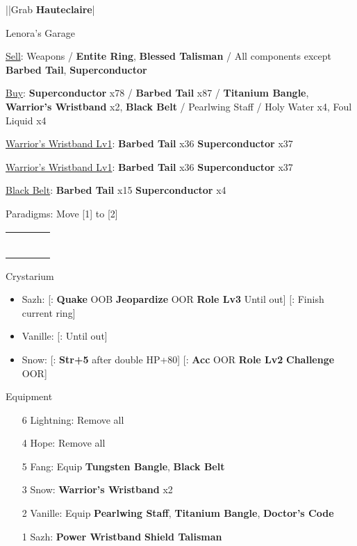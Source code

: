 \begin{mainlist}
	\item \skip|\skip|Grab \textbf{Hauteclaire}|\skip
\end{mainlist}
\begin{shop}{Lenora's Garage}
	\item \underline{Sell}: Weapons / \textbf{Entite Ring}, \textbf{Blessed Talisman} / All components except \textbf{Barbed Tail}, \textbf{Superconductor}
	\item \underline{Buy}: \textbf{Superconductor} x78 / \textbf{Barbed Tail} x87 / \textbf{Titanium Bangle}, \textbf{Warrior's Wristband} x2, \textbf{Black Belt} / Pearlwing Staff / Holy Water x4, Foul Liquid x4
\end{shop}
\begin{upgrade}
	\item \underline{Warrior's Wristband Lv1}: \textbf{Barbed Tail} x36 \to \textbf{Superconductor} x37
	\item \underline{Warrior's Wristband Lv1}: \textbf{Barbed Tail} x36 \to \textbf{Superconductor} x37
	\item \underline{Black Belt}: \textbf{Barbed Tail} x15 \to \textbf{Superconductor} x4
\end{upgrade}
\begin{menu}
	\item Paradigms: Move [1] to [2]
	\begin{tabular}{cccl}
		\chrole{\syn} & \sab & \rav &          \\
		\com          & \med & \com &          \\
		\syn          & \med & \com &  \\
		\com          & \sab & \com &          \\
		\syn          & \sab & \com &          \\
		\com          & \rav & \com &
	\end{tabular}
	\item Crystarium
	\begin{itemize}
		\item Sazh: [\com: \textbf{Quake} OOB \to \textbf{Jeopardize} OOR \to \textbf{Role Lv3} \to Until out] [\rav: Finish current ring]
		\item Vanille: [\med: Until out]
		\item Snow: [\rav: \textbf{Str+5} after double HP+80] [\sen: \textbf{Acc} OOR \to \textbf{Role Lv2} \to \textbf{Challenge} OOR]
	\end{itemize}
	\item Equipment
	\begin{itemize}
		\item [6] Lightning: Remove all
		\item [4] Hope: Remove all
		\item [5] Fang: Equip \textbf{Tungsten Bangle}, \textbf{Black Belt}
		\item [3] Snow: \textbf{Warrior's Wristband\star} x2
		\item [2] Vanille: Equip \textbf{Pearlwing Staff}, \textbf{Titanium Bangle}, \textbf{Doctor's Code}
		\item [1] Sazh: \textbf{Power Wristband} \to \textbf{Shield Talisman}
	\end{itemize}
\end{menu}
